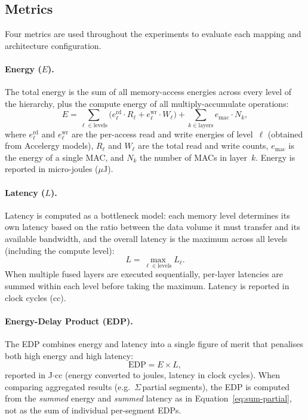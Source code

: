 \subsection{Metrics}
\label{sec:metrics}

Four metrics are used throughout the experiments to evaluate each
mapping and architecture configuration.

\paragraph{Energy ($E$).}
The total energy is the sum of all memory-access energies across every
level of the hierarchy, plus the compute energy of all multiply-accumulate
operations:
%
\begin{equation}
  E = \sum_{\ell \in \text{levels}}
      \bigl(e^{\text{rd}}_\ell \cdot R_\ell
          + e^{\text{wr}}_\ell \cdot W_\ell\bigr)
    + \sum_{k \in \text{layers}} e_{\text{mac}} \cdot N_k,
  \label{eq:energy}
\end{equation}
%
where $e^{\text{rd}}_\ell$ and $e^{\text{wr}}_\ell$ are the per-access
read and write energies of level~$\ell$ (obtained from Accelergy
models), $R_\ell$ and $W_\ell$ are the total read and write counts,
$e_{\text{mac}}$ is the energy of a single MAC, and $N_k$ the number
of MACs in layer~$k$.
Energy is reported in micro-joules ($\mu$J).

\paragraph{Latency ($L$).}
Latency is computed as a bottleneck model: each memory level determines
its own latency based on the ratio between the data volume it must
transfer and its available bandwidth, and the overall latency is the
maximum across all levels (including the compute level):
%
\begin{equation}
  L = \max_{\ell \in \text{levels}} L_\ell.
  \label{eq:latency}
\end{equation}
%
When multiple fused layers are executed sequentially, per-layer
latencies are summed within each level before taking the maximum.
Latency is reported in clock cycles (cc).

\paragraph{Energy-Delay Product (EDP).}
The EDP combines energy and latency into a single figure of merit that
penalises both high energy and high latency:
%
\begin{equation}
  \text{EDP} = E \times L,
  \label{eq:edp}
\end{equation}
%
reported in J$\cdot$cc (energy converted to joules, latency in clock
cycles).
When comparing aggregated results (e.g.\ $\Sigma$\,partial segments),
the EDP is computed from the \emph{summed} energy and \emph{summed}
latency as in Equation~\eqref{eq:sum-partial}, not as the sum of
individual per-segment EDPs.

